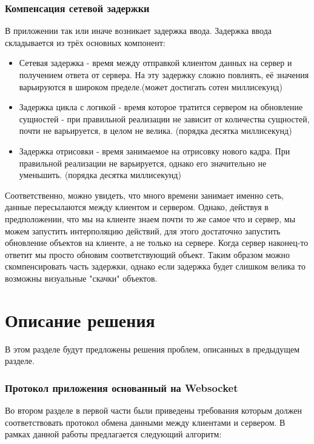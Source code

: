 \documentclass[a4paper,14pt, openany]{book}
\begin{document}
\subsection{Компенсация сетевой задержки}

В приложении так или иначе возникает задержка ввода. Задержка ввода складывается из трёх основных компонент:

\begin{itemize}
   \item Сетевая задержка - время между отправкой клиентом данных на сервер и получением ответа от сервера. На эту задержку сложно повлиять, её значения варьируются в широком пределе.(может достигать сотен миллисекунд)
   \item Задержка цикла с логикой - время которое тратится сервером на обновление сущностей - при правильной реализации не зависит от количества сущностей, почти не варьируется, в целом не велика. (порядка десятка миллисекунд)
   \item Задержка отрисовки - время занимаемое на отрисовку нового кадра. При правильной реализации не варьируется, однако его значительно не уменьшить. (порядка десятка миллисекунд)
\end{itemize}

Соответственно, можно увидеть, что много времени занимает именно сеть, данные пересылаются между клиентом и сервером. Однако, действуя в предположении, что мы на клиенте знаем почти то же самое что и сервер, мы можем запустить интерполяцию действий, для этого достаточно запустить обновление объектов на клиенте, а не только на сервере. Когда сервер наконец-то ответит мы просто обновим соответствующий объект. Таким образом можно скомпенсировать часть задержки, однако если задержка будет слишком велика то возможны визуальные "скачки" объектов. 

\chapter {Описание решения }

В этом разделе будут предложены решения проблем, описанных в предыдущем разделе. 

\subsection{Протокол приложения основанный на Websocket}

Во втором разделе в первой части были приведены требования которым должен соответствовать протокол обмена данными между клиентами и сервером. В рамках данной работы предлагается следующий алгоритм:
\end{document}

